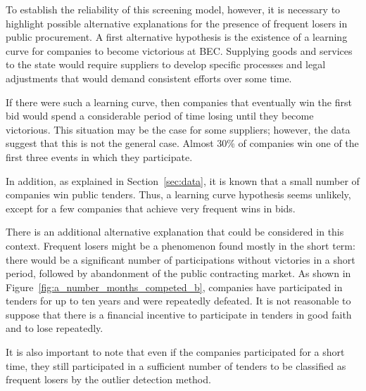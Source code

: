 To establish the reliability of this screening model, however, it is necessary to highlight possible alternative explanations for the presence of frequent losers in public procurement. A first alternative hypothesis is the existence of a learning curve for companies to become victorious at BEC. Supplying goods and services to the state would require suppliers to develop specific processes and legal adjustments that would demand consistent efforts over some time.

If there were such a learning curve, then companies that eventually win the first bid would spend a considerable period of time losing until they become victorious. This situation may be the case for some suppliers; however, the data suggest that this is not the general case. Almost 30\% of companies win one of the first three events in which they participate.

In addition, as explained in Section~\ref{sec:data}, it is known that a small number of companies win public tenders. Thus, a learning curve hypothesis seems unlikely, except for a few companies that achieve very frequent wins in bids.

There is an additional alternative explanation that could be considered in this context. Frequent losers might be a phenomenon found mostly in the short term: there would be a significant number of participations without victories in a short period, followed by abandonment of the public contracting market. As shown in Figure~\ref{fig:a_number_months_competed_b}, companies have participated in tenders for up to ten years and were repeatedly defeated. It is not reasonable to suppose that there is a financial incentive to participate in tenders in good faith and to lose repeatedly.

It is also important to note that even if the companies participated for a short time, they still participated in a sufficient number of tenders to be classified as frequent losers by the outlier detection method.

